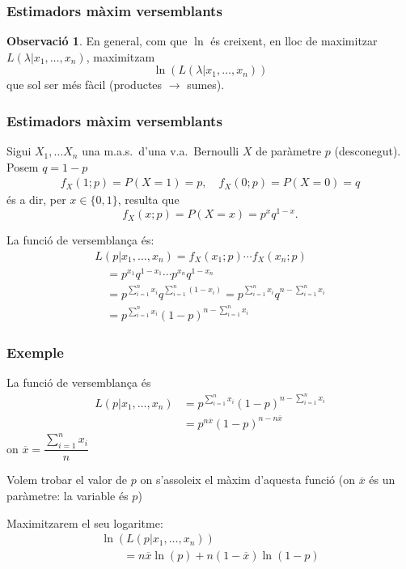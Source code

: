 \documentclass[12pt,t]{beamer}
\theoremstyle{plain}
\theoremstyle{definition}
\newtheorem{obs}{Observació}
\begin{document}
\begin{frame}
\frametitle{Estimadors màxim versemblants}

\vspace{1cm}

\begin{obs}
En general, com que $\ln$ és creixent, en lloc de maximitzar $L(\lambda|x_1,\ldots,x_n)$, maximitzam
$$
\ln(L(\lambda|x_1,\ldots,x_n))
$$
que sol ser més fàcil (productes $\to$ sumes).
\end{obs}
\end{frame}


\begin{frame}
\frametitle{Estimadors màxim versemblants}
Sigui $X_{1},\ldots X_{n}$ una m.a.s.\ d'una v.a.\ Bernoulli $X$ de paràmetre $p$ (desconegut). Posem $q=1-p$
$$
\begin{array}{c}
f_X(1;p)=P(X=1)=p,\quad 
f_X(0;p)=P(X=0)=q
\end{array}
$$
és a dir, per $x\in\{0,1\}$, resulta que 
$$f_X(x;p)=P(X=x)=p^{x} q^{1-x}.$$

La funció de versemblança és:
$$
\begin{array}{l}
L(p|x_1,\ldots,x_n) = f_{X}(x_1;p)\cdots f_{X}(x_n;p)\\[1ex]
\quad =
p^{x_{1}}q^{1-x_{1}} \cdots  p^{x_{n}}q^{1-x_{n}}
\\[1ex]
\quad = p^{\sum_{i=1}^n x_{i}} q^{\sum_{i=1}^n (1-x_{i})}= p^{\sum_{i=1}^n x_{i}} q^{n-\sum_{i=1}^n x_{i}}\\[1ex]
\quad =p^{\sum_{i=1}^n x_{i}} (1-p)^{n-\sum_{i=1}^n x_{i}}
\end{array}
$$
\end{frame}

\begin{frame}
\frametitle{Exemple}
La funció de versemblança és
$$
\begin{array}{rl}
L(p|x_1,\ldots,x_n) & =p^{\sum_{i=1}^n x_{i}} (1-p)^{n-\sum_{i=1}^n x_{i}}\\
& =p^{n\overline{x}}(1-p)^{n-n\overline{x}}
\end{array}
$$
on $\overline{x}=\dfrac{\sum_{i=1}^n x_{i}}{n}$
\medskip


Volem trobar el valor de $p$ on s'assoleix el màxim d'aquesta funció (on $\overline{x}$ és un paràmetre: la variable és $p$)
\medskip

Maximitzarem el seu logaritme:
$$
\begin{array}{l}
\ln(L(p|x_1,\ldots,x_n))\\
\qquad \displaystyle=n\overline{x}\ln(p)+n(1-\overline{x})\ln(1-p)
\end{array}
$$
\end{frame}
\end{document}
